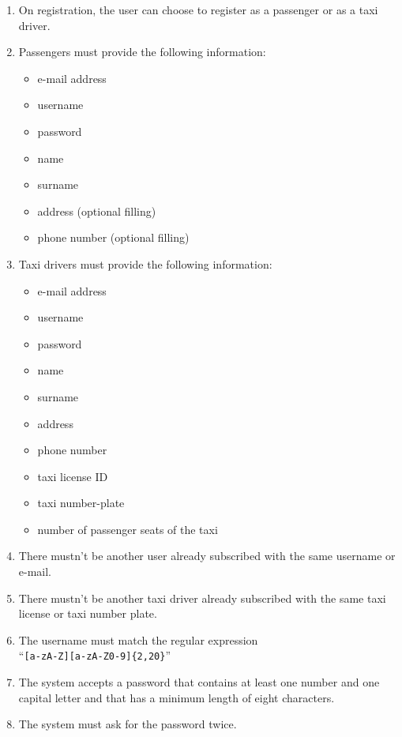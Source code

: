 \begin{enumerate}
    \item On registration, the user can choose to register as a passenger or as a taxi driver.
    \item Passengers must provide the following information:
    \begin{itemize}
        \item e-mail address
        \item username
        \item password
        \item name
        \item surname
        \item address (optional filling)
        \item phone number (optional filling)
    \end{itemize}
    \item Taxi drivers must provide the following information:
    \begin{itemize}
        \item e-mail address
        \item username
        \item password
        \item name
        \item surname
        \item address
        \item phone number
        \item taxi license ID
        \item taxi number-plate
		\item number of passenger seats of the taxi
    \end{itemize}
    \item There mustn't be another user already subscribed with the same username or e-mail. \label{f-sameInfo}
    \item There mustn't be another taxi driver already subscribed with the same taxi license or taxi number plate. \label{f-sameTaxi}
    \item The username must match the regular expression\\``\texttt{[a-zA-Z][a-zA-Z0-9]\{2,20\}}''    \label{f-usrn}
    \item The system accepts a password that contains at least one number and one capital letter and that has a minimum length of eight characters.  \label{f-psw1}
    \item The system must ask for the password twice.

\end{enumerate}
